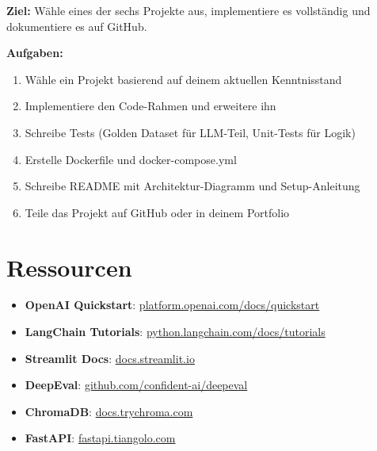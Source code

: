 \textbf{Ziel:} Wähle eines der sechs Projekte aus, implementiere es vollständig und dokumentiere es auf GitHub.

\textbf{Aufgaben:}
\begin{enumerate}[leftmargin=*]
    \item Wähle ein Projekt basierend auf deinem aktuellen Kenntnisstand
    \item Implementiere den Code-Rahmen und erweitere ihn
    \item Schreibe Tests (Golden Dataset für LLM-Teil, Unit-Tests für Logik)
    \item Erstelle Dockerfile und docker-compose.yml
    \item Schreibe README mit Architektur-Diagramm und Setup-Anleitung
    \item Teile das Projekt auf GitHub oder in deinem Portfolio
\end{enumerate}



\section{Ressourcen}

\begin{itemize}[leftmargin=*]
    \item \textbf{OpenAI Quickstart}: \href{https://platform.openai.com/docs/quickstart}{platform.openai.com/docs/quickstart}
    \item \textbf{LangChain Tutorials}: \href{https://python.langchain.com/docs/tutorials/}{python.langchain.com/docs/tutorials}
    \item \textbf{Streamlit Docs}: \href{https://docs.streamlit.io}{docs.streamlit.io}
    \item \textbf{DeepEval}: \href{https://github.com/confident-ai/deepeval}{github.com/confident-ai/deepeval}
    \item \textbf{ChromaDB}: \href{https://docs.trychroma.com}{docs.trychroma.com}
    \item \textbf{FastAPI}: \href{https://fastapi.tiangolo.com}{fastapi.tiangolo.com}
\end{itemize}


